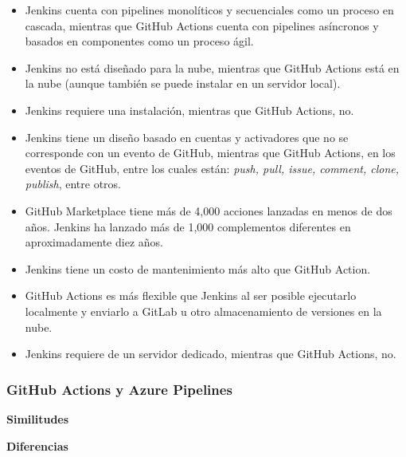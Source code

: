 \documentclass[twoside,twocolumn]{article}
\begin{document}
\begin{itemize}
    \item Jenkins cuenta con pipelines monolíticos y secuenciales como un proceso en cascada, mientras que GitHub Actions cuenta con pipelines asíncronos y basados en componentes como un proceso ágil.
    \item Jenkins no está diseñado para la nube, mientras que GitHub Actions está en la nube (aunque también se puede instalar en un servidor local).
    \item Jenkins requiere una instalación, mientras que GitHub Actions, no.
    \item Jenkins tiene un diseño basado en cuentas y activadores que no se corresponde con un evento de GitHub, mientras que GitHub Actions, en los eventos de GitHub, entre los cuales están: \textit{push, pull, issue, comment, clone, publish}, entre otros.
    \item GitHub Marketplace tiene más de 4,000 acciones lanzadas en menos de dos años. Jenkins ha lanzado más de 1,000 complementos diferentes en aproximadamente diez años.
    \item Jenkins tiene un costo de mantenimiento más alto que GitHub Action.
    \item GitHub Actions es más flexible que Jenkins al ser posible ejecutarlo localmente y enviarlo a GitLab u otro almacenamiento de versiones en la nube.
    \item Jenkins requiere de un servidor dedicado, mientras que GitHub Actions, no.
\end{itemize}

\subsubsection{GitHub Actions y Azure Pipelines}

\textbf{Similitudes}



\textbf{Diferencias}
\end{document}
